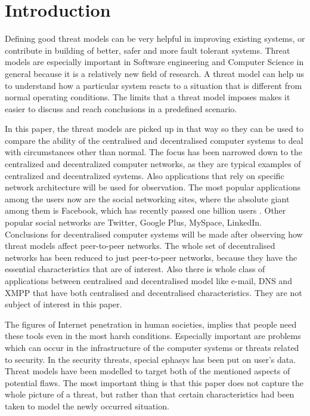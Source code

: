 \newpage
\section{Introduction}
Defining good threat models can be very helpful in improving existing systems, or contribute in building of better, safer and more fault tolerant systems.
Threat models are especially important in Software engineering and Computer Science in general because it is a relatively new field of research.
A threat model can help us to understand how a particular system reacts to a situation that is different from normal operating conditions.
The limits that a threat model imposes makes it easier to discuss and reach conclusions in a predefined scenario.

In this paper, the threat models are picked up in that way so they can be used to compare the ability of the centralised and decentralised computer systems to deal with circumstances other than normal.
The focus has been narrowed down to the centralized and decentralized computer networks, as they are typical examples of centralized and decentralized systems. Also applications that rely on specific network architecture will be used for observation.
The most popular applications among the users now are the social networking sites, where the absolute giant among them is Facebook, which has recently passed one billion users \cite{web:facebookpassesbillion}. Other popular social networks are Twitter, Google Plus, MySpace, LinkedIn.
Conclusions for decentralised computer systems will be made after observing how threat models affect peer-to-peer networks.
The whole set of decentralised networks has been reduced to just peer-to-peer networks, because they have the essential characteristics that are of interest.
Also there is whole class of applications between centralised and decentralised model like e-mail, DNS and XMPP that have both centralised and decentralised characteristics.
They are not subject of interest in this paper.

The figures of Internet penetration \cite{web:internetworldstats} in human societies, implies that people need these tools even in the most harsh conditions.
Especially important are problems which can occur in the infrastructure of the computer systems or threats related to security.
In the security threats, special ephasys has been put on user's data.
Threat models have been modelled to target both of the mentioned aspects of potential flaws.
The most important thing is that this paper does not capture the whole picture of a threat, but rather than that certain characteristics had been taken to model the newly occurred situation.

